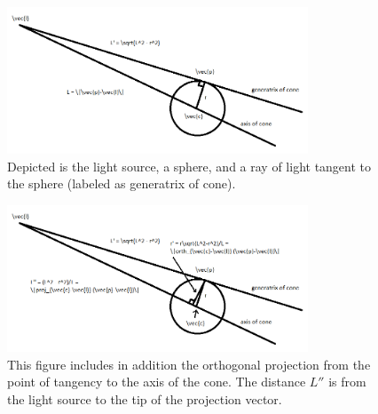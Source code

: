 \documentclass[10pt]{article}
\begin{document}
\begin{appendices}
\begin{figure}[h]\label{fig:shadow_1}
    \centering
    \includegraphics[width=0.8\textwidth]{sphere_shadow_figure_1.png}
    \caption{Depicted is the light source, a sphere, and a ray of light tangent to the sphere (labeled as generatrix of cone).}
\end{figure}

\begin{figure}[h]\label{fig:shadow_2}
    \centering
    \includegraphics[width=0.8\textwidth]{sphere_shadow_figure_2.png}
    \caption{This figure includes in addition the orthogonal projection from the point of tangency to the axis of the cone. The distance $L''$ is from the light source to the tip of the projection vector.}
\end{figure}



\end{appendices}
\end{document}
